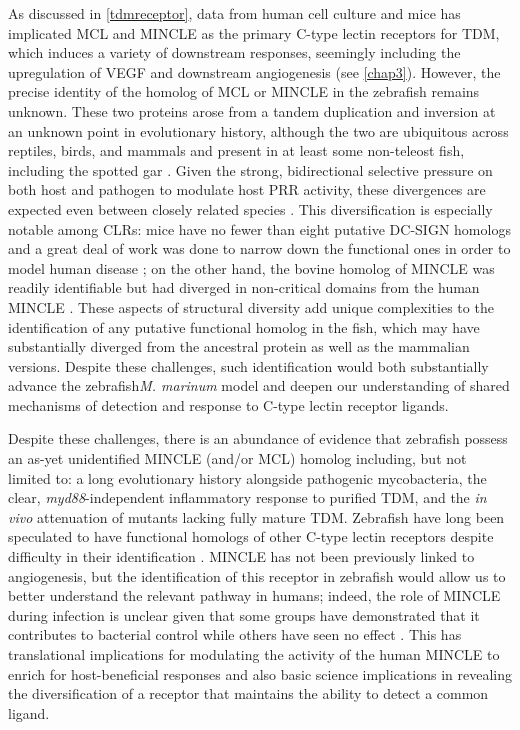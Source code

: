 As discussed in \autoref{tdmreceptor}, data from human cell culture and mice has implicated MCL and MINCLE as the primary C-type lectin receptors for TDM, which induces a variety of downstream responses, seemingly including the upregulation of VEGF and downstream angiogenesis (see \autoref{chap3}). However, the precise identity of the homolog of MCL or MINCLE in the zebrafish remains unknown. These two proteins arose from a tandem duplication and inversion at an unknown point in evolutionary history, although the two are ubiquitous across reptiles, birds, and mammals and present in at least some non-teleost fish, including the spotted gar \citep{Miyake2013, Richardson2014}. Given the strong, bidirectional selective pressure on both host and pathogen to modulate host PRR activity, these divergences are expected even between closely related species \citep{Rambaruth2015}. This diversification is especially notable among CLRs: mice have no fewer than eight putative DC-SIGN homologs and a great deal of work was done to narrow down the functional ones in order to model human disease \citep{GarciaVallejo2013}; on the other hand, the bovine homolog of MINCLE was readily identifiable but had diverged in non-critical domains from the human MINCLE \citep{Feinberg2013, Furukawa2013}. These aspects of structural diversity add unique complexities to the identification of any putative functional homolog in the fish, which may have substantially diverged from the ancestral protein as well as the mammalian versions. Despite these challenges, such identification would both substantially advance the zebrafish\textit{M. marinum} model and deepen our understanding of shared mechanisms of detection and response to C-type lectin receptor ligands.

Despite these challenges, there is an abundance of evidence that zebrafish possess an as-yet unidentified MINCLE (and/or MCL) homolog including, but not limited to: a long evolutionary history alongside pathogenic mycobacteria, the clear, \textit{myd88}-independent inflammatory response to purified TDM, and the \textit{in vivo} attenuation of mutants lacking fully mature TDM. Zebrafish have long been speculated to have functional homologs of other C-type lectin receptors despite difficulty in their identification \citep{Petit2019}. MINCLE has not been previously linked to angiogenesis, but the identification of this receptor in zebrafish would allow us to better understand the relevant pathway in humans; indeed, the role of MINCLE during infection is unclear given that some groups have demonstrated that it contributes to bacterial control while others have seen no effect \citep{Behler2012, Behler2015, Heitmann2013, Lee2012}. This has translational implications for modulating the activity of the human MINCLE to enrich for host-beneficial responses and also basic science implications in revealing the diversification of a receptor that maintains the ability to detect a common ligand. 

